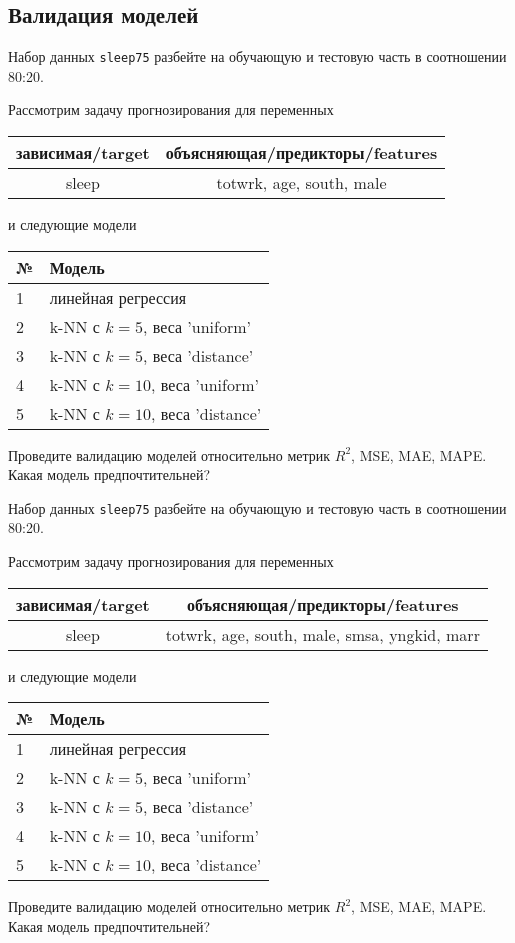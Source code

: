 \subsection{Валидация моделей}

\begin{exercise}
Набор данных \texttt{sleep75} разбейте на обучающую и тестовую часть
в соотношении 80:20.

Рассмотрим задачу прогнозирования для переменных
\begin{center}
	\begin{tabular}{|c|c|}\hline
		зависимая/target & объясняющая/предикторы/features \\ \hline
		sleep & totwrk, age, south, male \\ \hline
	\end{tabular}
\end{center}
и следующие модели
\begin{center}
	\begin{tabular}{|l|l|}\hline
		№ & Модель \\ \hline
		1 & линейная регрессия\\
		2 & k-NN с \(k=5\), веса 'uniform' \\
		3 & k-NN с \(k=5\), веса 'distance' \\
		4 & k-NN с \(k=10\), веса 'uniform' \\
		5 & k-NN с \(k=10\), веса 'distance' \\ \hline
	\end{tabular}
\end{center}
Проведите валидацию моделей относительно метрик \(R^2\), MSE, MAE,
MAPE. Какая модель предпочтительней?
\end{exercise}

\begin{exercise}
Набор данных \texttt{sleep75} разбейте на обучающую и тестовую часть
в соотношении 80:20.

Рассмотрим задачу прогнозирования для переменных
\begin{center}
	\begin{tabular}{|c|c|}\hline
		зависимая/target & объясняющая/предикторы/features \\ \hline
		sleep & totwrk, age, south, male, smsa, yngkid, marr \\ \hline
	\end{tabular}
\end{center}
и следующие модели
\begin{center}
	\begin{tabular}{|l|l|}\hline
		№ & Модель \\ \hline
		1 & линейная регрессия\\
		2 & k-NN с \(k=5\), веса 'uniform' \\
		3 & k-NN с \(k=5\), веса 'distance' \\
		4 & k-NN с \(k=10\), веса 'uniform' \\
		5 & k-NN с \(k=10\), веса 'distance' \\ \hline
	\end{tabular}
\end{center}
Проведите валидацию моделей относительно метрик \(R^2\), MSE, MAE,
MAPE. Какая модель предпочтительней?
\end{exercise}

